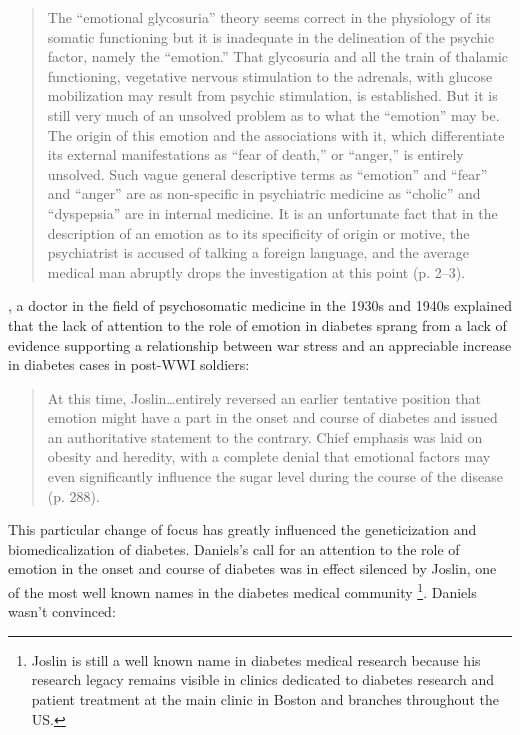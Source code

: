 \documentclass[12pt]{article}
\begin{document}
\begin{singlespace}
  \begin{quote}
The ``emotional glycosuria'' theory seems correct in the physiology of its somatic functioning but it is inadequate in the delineation of the psychic factor, namely the ``emotion.'' That glycosuria and all the train of thalamic functioning, vegetative nervous stimulation to the adrenals, with glucose mobilization may result from psychic stimulation, is established. But it is still very much of an unsolved problem as to what the ``emotion'' may be. The origin of this emotion and the associations with it, which differentiate its external manifestations as ``fear of death,'' or ``anger,'' is entirely unsolved. Such vague general descriptive terms as ``emotion'' and ``fear'' and ``anger'' are as non-specific in psychiatric medicine as ``cholic'' and ``dyspepsia'' are in internal medicine. It is an unfortunate fact that in the description of an emotion as to its specificity of origin or motive, the psychiatrist is accused of talking a foreign language, and the average medical man abruptly drops the investigation at this point (p. 2--3).
    \end{quote} 
\end{singlespace}

\citet{daniels_role_1948}, a doctor in the field of psychosomatic medicine in the 1930s and 1940s explained that the lack of attention to the role of emotion in diabetes sprang from a lack of evidence supporting a relationship between war stress and an appreciable increase in diabetes cases in post-WWI soldiers:

\begin{singlespace}
  \begin{quote}
  At this time, Joslin\dots entirely reversed an earlier tentative position that emotion might have a part in the onset and course of diabetes and issued an authoritative statement to the contrary. Chief emphasis was laid on obesity and heredity, with a complete denial that emotional factors may even significantly influence the sugar level during the course of the disease (p. 288).
  \end{quote} 
\end{singlespace} 

This particular change of focus has greatly influenced the geneticization and biomedicalization of diabetes. Daniels's call for an attention to the role of emotion in the onset and course of diabetes was in effect silenced by Joslin, one of the most well known names in the diabetes medical community \footnote{Joslin is still a well known name in diabetes medical research because his research legacy remains visible in clinics dedicated to diabetes research and patient treatment at the main clinic in Boston and branches throughout the US.}. Daniels wasn't convinced: 
\end{document}
